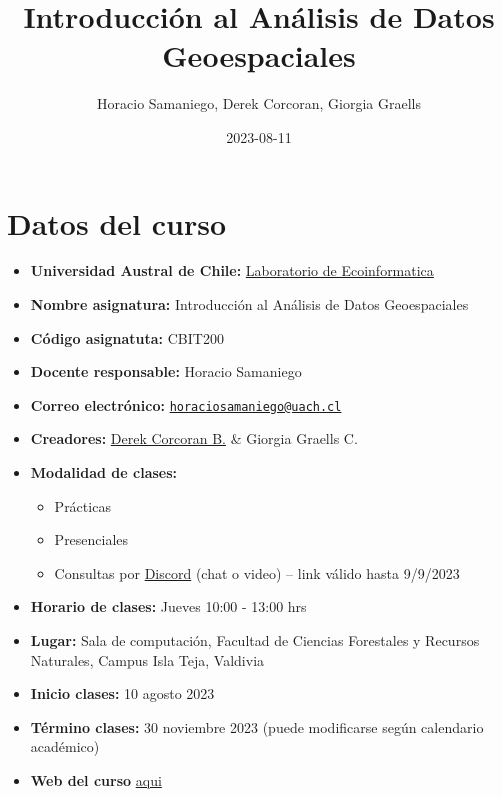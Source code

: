 \documentclass[
]{book}
\title{Introducción al Análisis de Datos Geoespaciales}
\author{Horacio Samaniego, Derek Corcoran, Giorgia Graells}
\date{2023-08-11}
\providecommand{\tightlist}{%
  \setlength{\itemsep}{0pt}\setlength{\parskip}{0pt}}
\begin{document}
\maketitle

{
\setcounter{tocdepth}{1}
\tableofcontents
}
\hypertarget{datos-del-curso}{%
\chapter{Datos del curso}\label{datos-del-curso}}

\begin{itemize}
\tightlist
\item
  \textbf{Universidad Austral de Chile:} \href{http://www.ecoinformatica.cl}{Laboratorio de Ecoinformatica}
\item
  \textbf{Nombre asignatura:} Introducción al Análisis de Datos Geoespaciales
\item
  \textbf{Código asignatuta:} CBIT200
\item
  \textbf{Docente responsable:} Horacio Samaniego
\item
  \textbf{Correo electrónico:} \href{mailto:horaciosamaniego@uach.cl}{\nolinkurl{horaciosamaniego@uach.cl}}
\item
  \textbf{Creadores:} \href{https://derek-corcoran-barrios.github.io/}{Derek Corcoran B.} \& Giorgia Graells C.
\item
  \textbf{Modalidad de clases:}

  \begin{itemize}
  \tightlist
  \item
    Prácticas
  \item
    Presenciales
  \item
    Consultas por \href{https://discord.gg/TWGvq53tm}{Discord} (chat o video) -- link válido hasta 9/9/2023
  \end{itemize}
\item
  \textbf{Horario de clases:} Jueves 10:00 - 13:00 hrs
\item
  \textbf{Lugar:} Sala de computación, Facultad de Ciencias Forestales y Recursos Naturales, Campus Isla Teja, Valdivia
\item
  \textbf{Inicio clases:} 10 agosto 2023
\item
  \textbf{Término clases:} 30 noviembre 2023 (puede modificarse según calendario académico)
\item
  \textbf{Web del curso} \href{https://cbit200-programacion-geoespacial.github.io/}{aqui}
\end{itemize}
\end{document}
